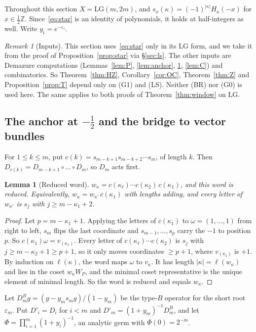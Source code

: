 \documentclass[11pt]{amsart}
\newtheorem{lemma}[theorem]{Lemma}
\theoremstyle{definition}
\theoremstyle{remark}
\newtheorem{remark}[theorem]{Remark}
\newcommand{\LG}{\mathrm{LG}}
\newcommand{\Z}{\mathbb{Z}}
\begin{document}
Throughout this section $X=\LG(m,2m)$, and $s_x(\kappa)=(-1)^{|\kappa|}H_\kappa(-x)$ for
$x\in\tfrac12\Z$. Since~\eqref{eq:star} is an identity of polynomials, it holds at
half-integers as well. Write $y_i=e^{-\varepsilon_i}$.

\begin{remark}[Inputs]\label{rem:deps}
This section uses~\eqref{eq:star} only in its $\LG$ form, and we take it from the proof of
Proposition~\ref{prop:star} via \S\ref{sec:ls}. The other inputs are Demazure computations
(Lemmas~\ref{lem:P}, \ref{lem:anchor}, \ref{lem:W}, \ref{lem:C}) and combinatorics. So
Theorem~\ref{thm:HZ}, Corollary~\ref{cor:OC}, Theorem~\ref{thm:Z} and Proposition~\ref{prop:T}
depend only on (G1) and (LS). Neither (BR) nor (G0) is used here. The same applies to both
proofs of Theorem~\ref{thm:window} on $\LG$.
\end{remark}

\subsection{The anchor at \texorpdfstring{$-\tfrac12$}{-1/2} and the bridge to vector bundles}
For $1\le k\le m$, put $c(k)=s_{m-k+1}s_{m-k+2}\cdots s_m$, of length $k$. Then
$D_{c(k)}=D_{m-k+1}\circ\dots\circ D_m$, so $D_m$ acts first.

\begin{lemma}[Reduced word]\label{lem:W}
$w_\kappa=c(\kappa_\ell)\cdots c(\kappa_2)\,c(\kappa_1)$, and this word is reduced. Equivalently,
$w_\kappa=w_{\kappa'}\,c(\kappa_1)$ with lengths adding, and every letter of $w_{\kappa'}$ is
$s_j$ with $j\ge m-\kappa_1+2$.
\end{lemma}

\begin{proof}
Let $p=m-\kappa_1+1$. Applying the letters of $c(\kappa_1)$ to $\omega=(1,\dots,1)$ from right to
left, $s_m$ flips the last coordinate and $s_{m-1},\dots,s_p$ carry the $-1$ to position $p$.
So $c(\kappa_1)\omega=v_{(\kappa_1)}$. Every letter of $c(\kappa_\ell)\cdots c(\kappa_2)$ is
$s_j$ with $j\ge m-\kappa_2+1\ge p+1$, so it only moves coordinates $\ge p+1$, where
$v_{(\kappa_1)}$ is $+1$. By induction on $\ell(\kappa)$, the word maps $\omega$ to
$v_\kappa$. It has length $|\kappa|=\ell(w_\kappa)$ and lies in the coset $w_\kappa W_P$, and
the minimal coset representative is the unique element of minimal length. So the word is
reduced and equals $w_\kappa$.
\end{proof}

Let $D^B_mg=(g-y_ms_mg)/(1-y_m)$ be the type-$B$ operator for the short root $\varepsilon_m$.
Put $D'_i=D_i$ for $i<m$ and $D'_m=(1+y_m)^{-1}D^B_m$, and let
$\Phi=\prod_{i=1}^m(1+y_i)^{-1}$, an analytic germ with $\Phi(0)=2^{-m}$.
\end{document}
